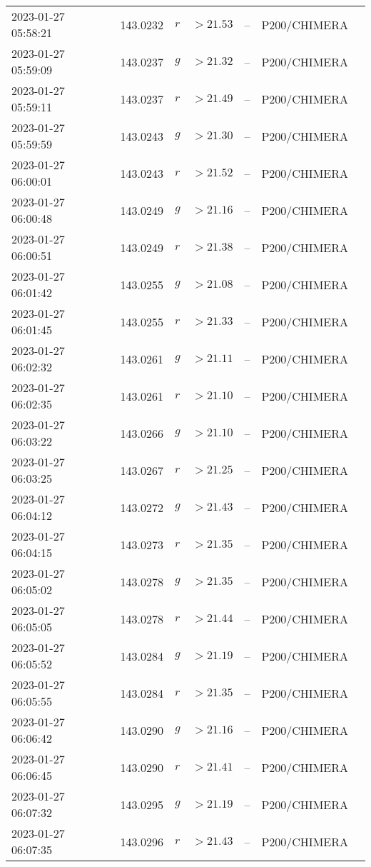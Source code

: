 \documentclass{nature_plusfigure}
\begin{document}
\begin{supplement}
\begin{center}
\begin{longtable}{lllllll}
2023-01-27 05:58:21 & 143.0232 & $r$ & $>21.53$ & -- & P200/CHIMERA &  \\ 
2023-01-27 05:59:09 & 143.0237 & $g$ & $>21.32$ & -- & P200/CHIMERA &  \\ 
2023-01-27 05:59:11 & 143.0237 & $r$ & $>21.49$ & -- & P200/CHIMERA &  \\ 
2023-01-27 05:59:59 & 143.0243 & $g$ & $>21.30$ & -- & P200/CHIMERA &  \\ 
2023-01-27 06:00:01 & 143.0243 & $r$ & $>21.52$ & -- & P200/CHIMERA &  \\ 
2023-01-27 06:00:48 & 143.0249 & $g$ & $>21.16$ & -- & P200/CHIMERA &  \\ 
2023-01-27 06:00:51 & 143.0249 & $r$ & $>21.38$ & -- & P200/CHIMERA &  \\ 
2023-01-27 06:01:42 & 143.0255 & $g$ & $>21.08$ & -- & P200/CHIMERA &  \\ 
2023-01-27 06:01:45 & 143.0255 & $r$ & $>21.33$ & -- & P200/CHIMERA &  \\ 
2023-01-27 06:02:32 & 143.0261 & $g$ & $>21.11$ & -- & P200/CHIMERA &  \\ 
2023-01-27 06:02:35 & 143.0261 & $r$ & $>21.10$ & -- & P200/CHIMERA &  \\ 
2023-01-27 06:03:22 & 143.0266 & $g$ & $>21.10$ & -- & P200/CHIMERA &  \\ 
2023-01-27 06:03:25 & 143.0267 & $r$ & $>21.25$ & -- & P200/CHIMERA &  \\ 
2023-01-27 06:04:12 & 143.0272 & $g$ & $>21.43$ & -- & P200/CHIMERA &  \\ 
2023-01-27 06:04:15 & 143.0273 & $r$ & $>21.35$ & -- & P200/CHIMERA &  \\ 
2023-01-27 06:05:02 & 143.0278 & $g$ & $>21.35$ & -- & P200/CHIMERA &  \\ 
2023-01-27 06:05:05 & 143.0278 & $r$ & $>21.44$ & -- & P200/CHIMERA &  \\ 
2023-01-27 06:05:52 & 143.0284 & $g$ & $>21.19$ & -- & P200/CHIMERA &  \\ 
2023-01-27 06:05:55 & 143.0284 & $r$ & $>21.35$ & -- & P200/CHIMERA &  \\ 
2023-01-27 06:06:42 & 143.0290 & $g$ & $>21.16$ & -- & P200/CHIMERA &  \\ 
2023-01-27 06:06:45 & 143.0290 & $r$ & $>21.41$ & -- & P200/CHIMERA &  \\ 
2023-01-27 06:07:32 & 143.0295 & $g$ & $>21.19$ & -- & P200/CHIMERA &  \\ 
2023-01-27 06:07:35 & 143.0296 & $r$ & $>21.43$ & -- & P200/CHIMERA &  \\ 

\end{longtable}
\end{center}
\end{supplement}
\end{document}
